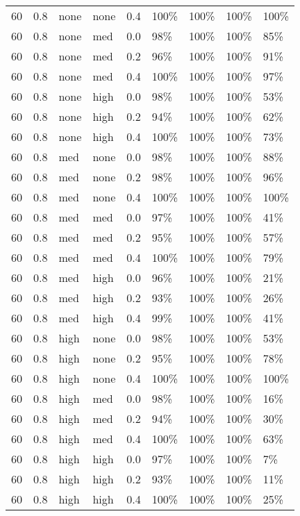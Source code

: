 \begin{longtable}{rrllrllll}
  60 & 0.8 & none & none & 0.4 & 100\% & 100\% & 100\% & 100\% \\ 
  60 & 0.8 & none & med & 0.0 & 98\% & 100\% & 100\% & 85\% \\ 
  60 & 0.8 & none & med & 0.2 & 96\% & 100\% & 100\% & 91\% \\ 
  60 & 0.8 & none & med & 0.4 & 100\% & 100\% & 100\% & 97\% \\ 
  60 & 0.8 & none & high & 0.0 & 98\% & 100\% & 100\% & 53\% \\ 
  60 & 0.8 & none & high & 0.2 & 94\% & 100\% & 100\% & 62\% \\ 
  60 & 0.8 & none & high & 0.4 & 100\% & 100\% & 100\% & 73\% \\ 
  60 & 0.8 & med & none & 0.0 & 98\% & 100\% & 100\% & 88\% \\ 
  60 & 0.8 & med & none & 0.2 & 98\% & 100\% & 100\% & 96\% \\ 
  60 & 0.8 & med & none & 0.4 & 100\% & 100\% & 100\% & 100\% \\ 
  60 & 0.8 & med & med & 0.0 & 97\% & 100\% & 100\% & 41\% \\ 
  60 & 0.8 & med & med & 0.2 & 95\% & 100\% & 100\% & 57\% \\ 
  60 & 0.8 & med & med & 0.4 & 100\% & 100\% & 100\% & 79\% \\ 
  60 & 0.8 & med & high & 0.0 & 96\% & 100\% & 100\% & 21\% \\ 
  60 & 0.8 & med & high & 0.2 & 93\% & 100\% & 100\% & 26\% \\ 
  60 & 0.8 & med & high & 0.4 & 99\% & 100\% & 100\% & 41\% \\ 
  60 & 0.8 & high & none & 0.0 & 98\% & 100\% & 100\% & 53\% \\ 
  60 & 0.8 & high & none & 0.2 & 95\% & 100\% & 100\% & 78\% \\ 
  60 & 0.8 & high & none & 0.4 & 100\% & 100\% & 100\% & 100\% \\ 
  60 & 0.8 & high & med & 0.0 & 98\% & 100\% & 100\% & 16\% \\ 
  60 & 0.8 & high & med & 0.2 & 94\% & 100\% & 100\% & 30\% \\ 
  60 & 0.8 & high & med & 0.4 & 100\% & 100\% & 100\% & 63\% \\ 
  60 & 0.8 & high & high & 0.0 & 97\% & 100\% & 100\% & 7\% \\ 
  60 & 0.8 & high & high & 0.2 & 93\% & 100\% & 100\% & 11\% \\ 
  60 & 0.8 & high & high & 0.4 & 100\% & 100\% & 100\% & 25\% \\ 

\end{longtable}
